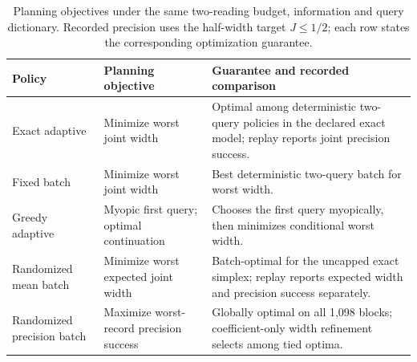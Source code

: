 \begin{table}[htbp]
\centering\small
\begin{tabular}{>{\raggedright\arraybackslash}p{.19\linewidth}>{\raggedright\arraybackslash}p{.25\linewidth}>{\raggedright\arraybackslash}p{.45\linewidth}}
\toprule
Policy & Planning objective & Guarantee and recorded comparison\\
\midrule
Exact adaptive & Minimize worst joint width & Optimal among deterministic two-query policies in the declared exact model; replay reports joint precision success.\\
Fixed batch & Minimize worst joint width & Best deterministic two-query batch for worst width.\\
Greedy adaptive & Myopic first query; optimal continuation & Chooses the first query myopically, then minimizes conditional worst width.\\
Randomized mean batch & Minimize worst expected joint width & Batch-optimal for the uncapped exact simplex; replay reports expected width and precision success separately.\\
Randomized precision batch & Maximize worst-record precision success & Globally optimal on all 1,098 blocks; coefficient-only width refinement selects among tied optima.\\
\bottomrule
\end{tabular}
\caption{Planning objectives under the same two-reading budget, information and query dictionary. Recorded precision uses the half-width target $J\leq1/2$; each row states the corresponding optimization guarantee.}
\label{tab:joint_objectives}
\end{table}

